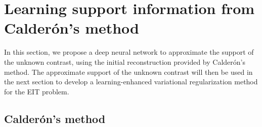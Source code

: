 \documentclass[11pt]{article}
\newcommand{\Calderon}{Calder\'{o}n}
\begin{document}
\section{Learning support information from \Calderon's method}\label{S3}
\setcounter{equation}{0}
In this section, we propose a deep neural network to approximate the support of the unknown contrast, using the initial reconstruction provided by \Calderon's method.
The approximate support of the unknown contrast will then be used in the next section to develop a learning-enhanced variational regularization method for the EIT problem.


\subsection{\Calderon's method}\label{S31}
\end{document}
